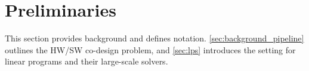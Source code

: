 


\section{Preliminaries}
This section provides background and defines notation. \cref{sec:background_pipeline} outlines the HW/SW co-design problem, and \cref{sec:lps} introduces the setting for linear programs and their large-scale solvers.

